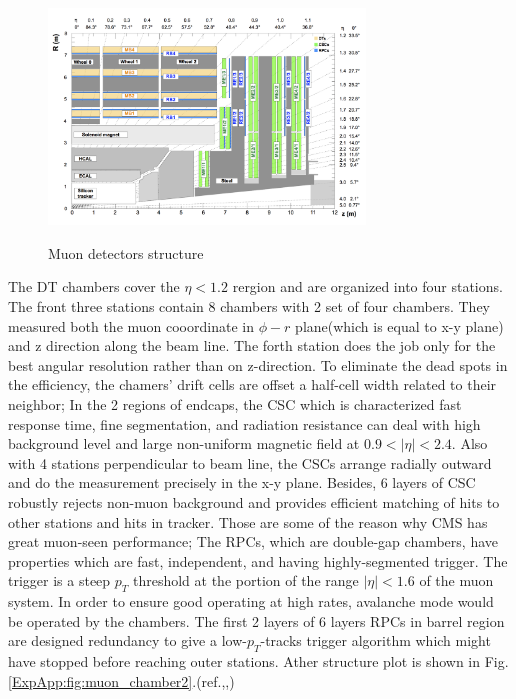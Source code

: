 			\begin{figure}[H]
			\centering{}
		    	\includegraphics[width=0.75\textwidth]{Figures/ExpApparatus/muon_chamber.png}\\
			\caption{Muon detectors structure\cite{Sirunyan:2018fp}}
			\label{ExpApp:fig:muon_chamber1}
			\end{figure}
			\FloatBarrier

			The DT chambers cover the $\eta < 1.2$ rergion and are organized into four stations. The front three stations contain 8 chambers with 2 set of four chambers. They measured both the muon cooordinate in $\phi - r$ plane(which is equal to x-y plane) and z direction along the beam line. The forth station does the job only for the best angular resolution rather than on z-direction. To eliminate the dead spots in the efficiency, the chamers' drift cells are offset a half-cell width related to their neighbor; In the 2 regions of endcaps, the CSC which is characterized fast response time, fine segmentation, and radiation resistance can deal with high background level and large non-uniform magnetic field at $0.9 < |\eta| < 2.4$. Also with 4 stations perpendicular to beam line, the CSCs arrange radially outward and do the measurement precisely in the x-y plane. Besides, 6 layers of CSC robustly rejects non-muon background and provides efficient matching of hits to other stations and hits in tracker. Those are some of the reason why CMS has great muon-seen performance; The RPCs, which are double-gap chambers, have properties which are fast, independent, and having highly-segmented trigger. The trigger is a steep $p_T$ threshold at the portion of the range $|\eta| < 1.6$ of the muon system. In order to ensure good operating at high rates, avalanche mode would be operated by the chambers. The first 2 layers of 6 layers RPCs in barrel region are designed redundancy to give a low-$p_T$-tracks trigger algorithm which might have stopped before reaching outer stations. Ather structure plot is shown in Fig.\ref{ExpApp:fig:muon_chamber2}.(ref.\cite{Chatrchyan:2008aa},\cite{Chatrchyan:2013sba},\cite{Sirunyan:2018fpa})
		
